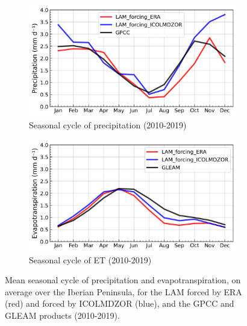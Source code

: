 \begin{figure}[htbp]
    \centering
    \begin{subfigure}[b]{0.49\textwidth}
        \caption{Seasonal cycle of precipitation (2010-2019)}
        \includegraphics[width=\textwidth]{images/chap4/forcing_source/IP_seasonal_cycle_precip.png}
    \end{subfigure}
    \begin{subfigure}[b]{0.49\textwidth}
        \caption{Seasonal cycle of ET (2010-2019)}
        \includegraphics[width=\textwidth]{images/chap4/forcing_source/IP_seasonal_cycle_evap.png}
    \end{subfigure}
    \caption{Mean seasonal cycle of precipitation and evapotranspiration, on average over the Iberian Peninsula, for the LAM forced by ERA (red) and forced by ICOLMDZOR (blue), and the GPCC and GLEAM products (2010-2019).}
    \label{fig:forcing_source_SC}
\end{figure}

